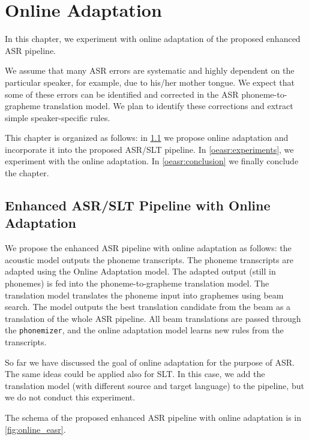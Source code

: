 \chapter{Online Adaptation}
\label{chap:adaptation}
In this chapter, we experiment with online adaptation of the proposed enhanced ASR pipeline.

We assume that many ASR errors are systematic and highly dependent on the particular speaker, for example, due to his/her mother tongue. We expect that some of these errors can be identified and corrected in the ASR phoneme-to-grapheme translation model. We plan to identify these corrections and extract simple speaker-specific rules. %

This chapter is organized as follows: in \cref{oeasr:model} we propose online adaptation and incorporate it into the proposed ASR/SLT pipeline. In \cref{oeasr:experiments}, we experiment with the online adaptation. In \cref{oeasr:conclusion} we finally conclude the chapter.

\section{Enhanced ASR/SLT Pipeline with Online Adaptation}
\label{oeasr:model}
We propose the enhanced ASR pipeline with online adaptation as follows: the acoustic model outputs the phoneme transcripts. The phoneme transcripts are adapted using the Online Adaptation model. The adapted output (still in phonemes) is fed into the phoneme-to-grapheme translation model. The translation model translates the phoneme input into graphemes using beam search. The model outputs the best translation candidate from the beam as a translation of the whole ASR pipeline. All beam translations are passed through the \texttt{phonemizer}, and the online adaptation model learns new rules from the transcripts.

So far we have discussed the goal of online adaptation for the purpose of ASR. The same ideas could be applied also for SLT. In this case, we add the translation model (with different source and target language) to the pipeline, but we do not conduct this experiment.

The schema of the proposed enhanced ASR pipeline with online adaptation is in \cref{fig:online_easr}.

